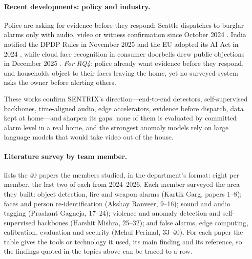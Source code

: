 \paragraph{Recent developments: policy and industry.} Police are asking for evidence before they respond: Seattle dispatches to burglar alarms only with audio, video or witness confirmation since October 2024 \cite{seattle2024alarm}. India notified the DPDP Rules in November 2025 \cite{pib2025dpdp} and the EU adopted its AI Act in 2024 \cite{eu2024aiact}, while cloud face recognition in consumer doorbells drew public objections in December 2025 \cite{perez2025ringfaces}. \emph{For RQ4:} police already want evidence before they respond, and households object to their faces leaving the home, yet no surveyed system asks the owner before alerting others.

These works confirm SENTRIX's direction---end-to-end detectors, self-supervised backbones, time-aligned audio, edge accelerators, evidence before dispatch, data kept at home---and sharpen its gaps: none of them is evaluated by committed alarm level in a real home, and the strongest anomaly models rely on large language models that would take video out of the house.

\paragraph{Literature survey by team member.}  lists the 40 papers the members studied, in the department's format: eight per member, the last two of each from 2024--2026. Each member surveyed the area they built: object detection, fire and weapon alarms (Kartik Garg, papers 1--8); faces and person re-identification (Akshay Ranveer, 9--16); sound and audio tagging (Prashant Gagneja, 17--24); violence and anomaly detection and self-supervised backbones (Harshit Mishra, 25--32); and false alarms, edge computing, calibration, evaluation and security (Mehul Perimal, 33--40). For each paper the table gives the tools or technology it used, its main finding and its reference, so the findings quoted in the topics above can be traced to a row.



